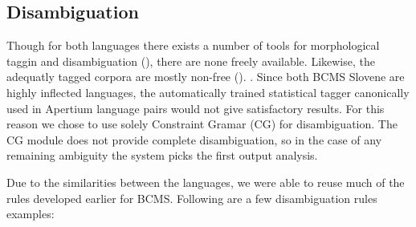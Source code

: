
\subsection{Disambiguation}
Though for both languages there exists a number of tools for
morphological taggin and disambiguation (), there
are none freely available. Likewise, the adequatly tagged corpora are
mostly non-free (). .  Since both BCMS Slovene are
highly inflected languages, the automatically trained statistical
tagger canonically used in Apertium language pairs would not give
satisfactory results. For this reason we chose to use solely
Constraint Gramar (CG) for disambiguation. The CG module does not
provide complete disambiguation, so in the case of any remaining
ambiguity the system picks the first output analysis.

Due to the similarities between the languages, we were able to
reuse much of the rules developed earlier for BCMS. Following are
a few disambiguation rules examples:

